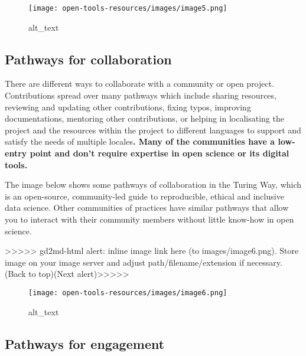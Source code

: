 \documentclass[
  letterpaper,
  DIV=11,
  numbers=noendperiod]{scrreport}
\begin{document}
\begin{figure}

{\centering \texttt{[image: open-tools-resources/images/image5.png]}

}

\caption{alt\_text}

\end{figure}

\hypertarget{pathways-for-collaboration}{%
\subsection{Pathways for
collaboration}\label{pathways-for-collaboration}}

There are different ways to collaborate with a community or open
project. Contributions spread over many pathways which include sharing
resources, reviewing and updating other contributions, fixing typos,
improving documentations, mentoring other contributions, or helping in
localisating the project and the resources within the project to
different languages to support and satisfy the needs of multiple
locales\textbf{. Many of the communities have a low-entry point and
don't require expertise in open science or its digital tools. }

The image below shows some pathways of collaboration in the Turing Way,
which is an open-source, community-led guide to reproducible, ethical
and inclusive data science. Other communities of practices have similar
pathways that allow you to interact with their community members without
little know-how in open science.

{\textgreater\textgreater\textgreater\textgreater\textgreater{}
gd2md-html alert: inline image link here (to images/image6.png). Store
image on your image server and adjust path/filename/extension if
necessary. }(Back to top)(Next
alert){\textgreater\textgreater\textgreater\textgreater\textgreater{} }

\begin{figure}

{\centering \texttt{[image: open-tools-resources/images/image6.png]}

}

\caption{alt\_text}

\end{figure}

\hypertarget{pathways-for-engagement}{%
\subsection{Pathways for engagement}\label{pathways-for-engagement}}
\end{document}
